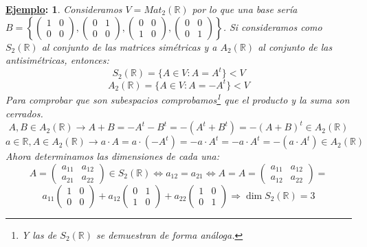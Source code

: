 \documentclass[10pt,a4paper,openright]{book}
\theoremstyle{break}
\newtheorem*{ej}{\underline{Ejemplo}:}
\begin{document}
\begin{ej}
Consideramos $V=Mat_2(\mathbb R)$ por lo que una base sería $B=\left\lbrace
\left(\begin{array}{cc}1&0\\ 0&0\end{array}\right),\left(\begin{array}{cc}0&1\\ 0&0\end{array}\right),
\left(\begin{array}{cc}0&0\\ 1&0\end{array}\right),
\left(\begin{array}{cc}0&0\\ 0&1\end{array}\right)
\right\rbrace$. Si consideramos como $S_2(\mathbb{R})$ al conjunto de las matrices simétricas y a $A_2(\mathbb R)$ al conjunto de las antisimétricas, entonces:
$$S_2(\mathbb R)=\{A\in V: A=A^t\}<V$$
$$A_2(\mathbb R)=\{A\in V: A=-A^t\}<V$$
Para comprobar que son subespacios comprobamos\footnote{Y las de $S_2(\mathbb R)$ se demuestran de forma análoga.} que el producto y la suma son cerrados.
$$A,B\in A_2(\mathbb R)\rightarrow A+B=-A^t-B^t=-(A^t+B^t)=-(A+B)^t\in A_2(\mathbb R)$$
$$a\in \mathbb R, A\in A_2(\mathbb R)\rightarrow a\cdot A=a\cdot (-A^t)=-a\cdot A^t=-a\cdot A^t=-(a\cdot A^t)\in A_2(\mathbb R)$$
Ahora determinamos las dimensiones de cada una:
$$A=\left(\begin{array}{cc}a_{11}&a_{12}\\ a_{21}&a_{22}\end{array}\right)\in S_2(\mathbb R)\Leftrightarrow a_{12}=a_{21}\Leftrightarrow A=A=\left(\begin{array}{cc}a_{11}&a_{12}\\ a_{12}&a_{22}\end{array}\right)=$$
$$a_{11}\left(\begin{array}{cc}1&0\\ 0&0\end{array}\right)+ a_{12}\left(\begin{array}{cc}0&1\\ 1&0\end{array}\right)+a_{22} \left(\begin{array}{cc}1&0\\ 0&1\end{array}\right)\Rightarrow \dim S_2(\mathbb R)=3$$


\end{ej}
\end{document}
